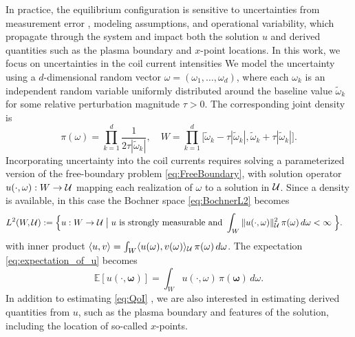 In practice, the equilibrium configuration is sensitive to uncertainties from measurement error 
,
modeling assumptions, and operational variability, which propagate through the system and impact both the solution $u$ and 
derived quantities such as the plasma boundary and $x$-point locations. In this work, we focus on uncertainties in the coil current intensities
We model the uncertainty using a $d$-dimensional random vector $\omega= (\omega_1, \ldots, \omega_d)$, 
where each $\omega_k$ is an independent random variable uniformly distributed around the baseline value 
$\widetilde{\omega}_k$ for some relative perturbation magnitude $\tau > 0$. The corresponding joint density is
%
\[
\pi \left(\omega\right)=\prod_{k=1}^{d} \frac{1}{2\tau |\widetilde{\omega}_k|},\quad 
W=\prod_{k=1}^{d}\Big[ \widetilde{\omega}_k-\tau  | \widetilde{\omega}_k | ,\widetilde{\omega}_k+\tau  | \widetilde{\omega}_k  | \Big].
\]
%
Incorporating uncertainty into the coil currents requires solving a parameterized version of the free-boundary problem \eqref{eq:FreeBoundary}, 
with solution operator $u(\cdot,\omega) : W \to \mathcal{U}$ mapping each realization of $\omega$ to a solution in $\mathcal{U}$. 
Since a density is available, in this case the Bochner space  \eqref{eq:BochnerL2} becomes
\begin{align*}     
  L^2(W, \mathcal{U}) := \Big\{ u: W \rightarrow \mathcal{U} \;\big|\; & 
                                    u \mbox{ is strongly measurable and } 
                                       \int_W \| u(\cdot,\omega) \|_{\mathcal{U}}^2 \, \pi(\omega) \, d\omega < \infty \; \Big\}.
\end{align*}
with inner product $ \langle u, v \rangle =  \int_W  \langle  u(\omega) , v(\omega)  \rangle_{\mathcal{U}} \, \pi(\omega) \, d\omega$.
The expectation   \eqref{eq:expectation_of_u} becomes
 \begin{equation}  \label{eq:QoI}
      \mathbb{E}\left[u(\cdot,\boldsymbol \omega)\right]=\int_W u(\cdot,\omega) \, \pi(\boldsymbol\omega) \,d\omega.
 \end{equation}
 In addition to estimating  \eqref{eq:QoI} , we are also interested in estimating derived quantities from $u$, such as the plasma boundary 
 and features of the solution, including the location of so-called  $x$-points.



